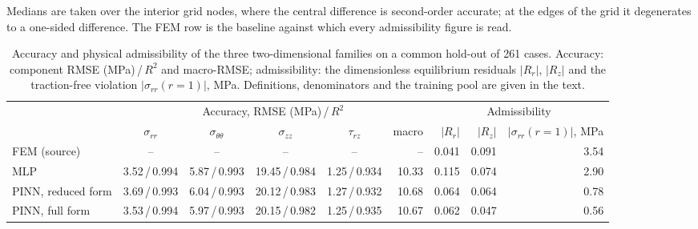 Medians are taken over the interior grid nodes, where the central difference is second-order accurate; at the edges of the grid it degenerates to a one-sided difference. %
The FEM row is the baseline against which every admissibility figure is read. %
\begin{table}[t]
\caption{Accuracy and physical admissibility of the three two-dimensional families on a common hold-out of 261 cases. Accuracy: component RMSE (MPa)\,/\,$R^2$ and macro-RMSE; admissibility: the dimensionless equilibrium residuals $|R_r|$, $|R_z|$ and the traction-free violation $|\sigma_{rr}(r{=}1)|$, MPa. Definitions, denominators and the training pool are given in the text.}
\label{tab:admissibility}
\centering\small
\setlength{\tabcolsep}{4pt}
\begin{tabular}{@{}lccccrrrr@{}}
\toprule
 & \multicolumn{5}{c}{Accuracy, RMSE (MPa)\,/\,$R^2$} & \multicolumn{3}{c}{Admissibility} \\
\cmidrule(lr){2-6}\cmidrule(lr){7-9}
 & $\sigma_{rr}$ & $\sigma_{\theta\theta}$ & $\sigma_{zz}$ & $\tau_{rz}$ & macro & $|R_r|$ & $|R_z|$ & $|\sigma_{rr}(r{=}1)|$, MPa \\
\midrule
FEM (source)       & --           & --           & --            & --           & --    & 0.041 & 0.091 & 3.54 \\
MLP                & 3.52\,/\,0.994 & 5.87\,/\,0.993 & 19.45\,/\,0.984 & 1.25\,/\,0.934 & 10.33 & 0.115 & 0.074 & 2.90 \\
PINN, reduced form & 3.69\,/\,0.993 & 6.04\,/\,0.993 & 20.12\,/\,0.983 & 1.27\,/\,0.932 & 10.68 & 0.064 & 0.064 & 0.78 \\
PINN, full form    & 3.53\,/\,0.994 & 5.97\,/\,0.993 & 20.15\,/\,0.982 & 1.25\,/\,0.935 & 10.67 & 0.062 & 0.047 & 0.56 \\
\bottomrule
\end{tabular}
\end{table}

